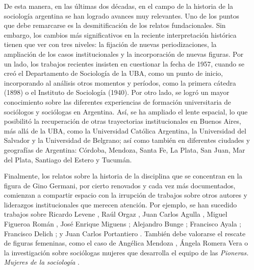 {De esta manera, en las últimas dos décadas, en el campo de la historia de la sociología argentina se han logrado avances muy relevantes. Uno de los puntos que debe remarcarse es la desmitificación de los relatos fundacionales. Sin embargo, los cambios más significativos en la reciente interpretación histórica tienen que ver con tres niveles: la fijación de nuevas periodizaciones, la ampliación de los casos institucionales y la incorporación de nuevas figuras. Por un lado, los trabajos recientes insisten en cuestionar la fecha de 1957, cuando se creó el Departamento de Sociología de la UBA, como un punto de inicio, incorporando al análisis otros momentos y períodos, como la primera cátedra (1898) o el Instituto de Sociología (1940). Por otro lado, se logró un mayor conocimiento sobre las diferentes experiencias de formación universitaria de sociólogos y sociólogas en Argentina. Así, se ha ampliado el lente espacial, lo que posibilitó la recuperación de otras trayectorias institucionales en Buenos Aires, más allá de la UBA, como la Universidad Católica Argentina, la Universidad del Salvador y la Universidad de Belgrano; así como también en diferentes ciudades y geografías de Argentina: Córdoba, Mendoza, Santa Fe, La Plata, San Juan, Mar del Plata, Santiago del Estero y Tucumán.

Finalmente, los relatos sobre la historia de la disciplina que se concentran en la figura de Gino Germani, por cierto renovados y cada vez más documentados, comienzan a compartir espacio con la irrupción de trabajos sobre otros autores y liderazgos institucionales que merecen atención. Por ejemplo, se han sucedido trabajos sobre Ricardo Levene \parencite{1530-RAJMANOVICH2016}, Raúl Orgaz \parencite{1528-REQUENA2010,1672-GRISENDI2011}, Juan Carlos Agulla \parencite{1675-GRISENDI2013}, Miguel Figueroa Román \parencite{1663-PEREYRA2012}, José Enrique Miguens \parencite{1677-GIORGI2013}; Alejandro Bunge \parencite{1671-GONZALEZBOLLO2012}; Francisco Ayala \parencite{1619-ESCOBAR2011}; Francisco Delich \parencite{1580-CASCO2018}; y Juan Carlos Portantiero \parencite{1581-CASCO2019,1582-CASCO2020}. También debe valorarse el rescate de figuras femeninas, como el caso de Angélica Mendoza \parencite{1623-FICCARDI2022}, Ángela Romera Vera \parencite{1620-ESCOBAR2016} o la investigación sobre sociólogas mujeres que desarrolla el equipo de las \emph{Pioneras. Mujeres de la sociología} \parencite{1564-BLANCO2019}.

}
